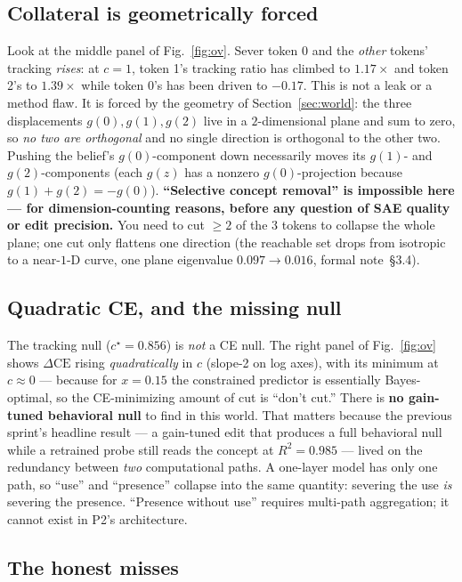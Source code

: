 \documentclass[11pt]{article}
\newcommand{\gv}[1]{g(#1)}
\newcommand{\ceword}{\mathrm{CE}}
\begin{document}
\subsection{Collateral is geometrically forced}

Look at the middle panel of Fig.~\ref{fig:ov}. Sever token $0$ and the
\emph{other} tokens' tracking \emph{rises}: at $c=1$, token 1's tracking ratio
has climbed to $1.17\times$ and token 2's to $1.39\times$ while token 0's has
been driven to $-0.17$. This is not a leak or a method flaw. It is forced by the
geometry of Section~\ref{sec:world}: the three displacements $\gv{0},\gv{1},\gv{2}$
live in a $2$-dimensional plane and sum to zero, so \emph{no two are
orthogonal} and no single direction is orthogonal to the other two. Pushing the
belief's $\gv{0}$-component down necessarily moves its $\gv{1}$- and
$\gv{2}$-components (each $\gv{z}$ has a nonzero $\gv{0}$-projection because
$\gv{1}+\gv{2}=-\gv{0}$). \textbf{``Selective concept removal'' is impossible
here --- for dimension-counting reasons, before any question of SAE quality or
edit precision.} You need to cut $\ge 2$ of the $3$ tokens to collapse the whole
plane; one cut only flattens one direction (the reachable set drops from
isotropic to a near-$1$-D curve, one plane eigenvalue $0.097\to0.016$, formal
note~\S3.4).

\subsection{Quadratic CE, and the missing null}

The tracking null ($c^\star=0.856$) is \emph{not} a CE null. The right panel of
Fig.~\ref{fig:ov} shows $\Delta\ceword$ rising \emph{quadratically} in $c$
(slope-2 on log axes), with its minimum at $c\approx0$ --- because for
$x=0.15$ the constrained predictor is essentially Bayes-optimal, so the
CE-minimizing amount of cut is ``don't cut.'' There is \textbf{no gain-tuned
behavioral null} to find in this world. That matters because the previous
sprint's headline result --- a gain-tuned edit that produces a full behavioral
null while a retrained probe still reads the concept at $R^2=0.985$ --- lived on
the redundancy between \emph{two} computational paths. A one-layer model has
only one path, so ``use'' and ``presence'' collapse into the same quantity:
severing the use \emph{is} severing the presence. ``Presence without use''
requires multi-path aggregation; it cannot exist in P2's architecture.

\subsection{The honest misses}
\end{document}

